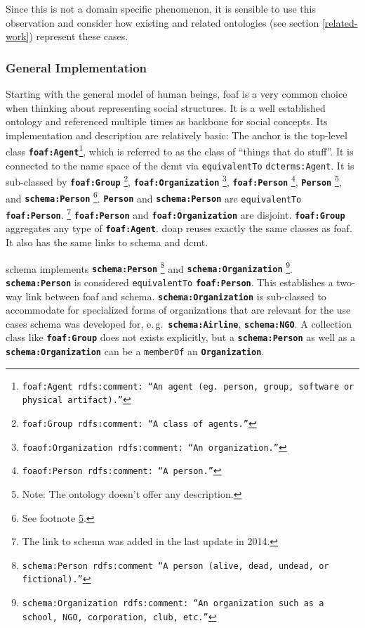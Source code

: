 \documentclass[a4paper, DIV=13, BCOR=0cm]{scrbook}
\newcommand{\eg}{e.\,g.\ }
\newcommand{\class}[1]{\texttt{\textbf{#1}}}
\newcommand{\relation}[1]{\texttt{#1}}
\newcommand{\foottt}[1]{\footnote{\texttt{#1}}}
\begin{document}
Since this is not a domain specific phenomenon, it is sensible to use this observation and consider how existing and related ontologies (see section \ref{related-work}) represent these cases.

\subsubsection{General Implementation }
\label{human-beings-in-other-ontologies}
Starting with the general model of human beings, \gls{foaf} is a very common choice when thinking about representing social structures. It is a well established ontology and referenced multiple times as backbone for social concepts. Its implementation and description are relatively basic: The anchor is the top-level class \class{foaf:Agent}\foottt{foaf:Agent rdfs:comment: \enquote{An agent (eg. person, group, software or physical artifact).}}, which is referred to as the class of \enquote{things that do stuff}. It is connected to the name space of the \gls{dcmt} via \relation{equivalentTo} \relation{dcterms:Agent}. It is sub-classed by 
%
\class{foaf:Group}%
	\foottt{foaf:Group rdfs:comment: \enquote{A class of agents.}},
%
\class{foaf:Organization}%
	\foottt{foaof:Organization rdfs:comment: \enquote{An organization.}},
%
\class{foaf:Person}%
	\foottt{foaof:Person rdfs:comment: \enquote{A person.}},
%
\class{Person}%
	\footnote{\label{footn:no-desc}Note: The ontology doesn't offer any description.}, and
\class{schema:Person}%
	\footnote{See footnote \ref{footn:no-desc}.}.
\class{Person} and \class{schema:Person} are \relation{equivalentTo} \class{foaf:Person}.%
	\footnote{The link to \gls{schema} was added in the last update in 2014.} \class{foaf:Person} and \class{foaf:Organization} are disjoint. \class{foaf:Group} aggregates any type of \class{foaf:Agent}. \gls{doap} reuses exactly the same classes as \gls{foaf}. It also has the same links to \gls{schema} and \gls{dcmt}.

\gls{schema} implements
\class{schema:Person}%
	\foottt{schema:Person rdfs:comment \enquote{A person (alive, dead, undead, or fictional).}} and
%
\class{schema:Organization}%
	\foottt{schema:Organization rdfs:comment: \enquote{An organization such as a school, NGO, corporation, club, etc.}}.
%
\class{schema:Person} is considered \relation{equivalentTo} \class{foaf:Person}. This establishes a two-way link between \gls{foaf} and \gls{schema}. \class{schema:Organization} is sub-classed to accommodate for specialized forms of organizations that are relevant for the use cases schema was developed for, \eg \class{schema:Airline}, \class{schema:NGO}. A collection class like \class{foaf:Group} does not exists explicitly, but a \class{schema:Person} as well as a \class{schema:Organization} can be a \relation{memberOf} an \class{Organization}.
\end{document}
